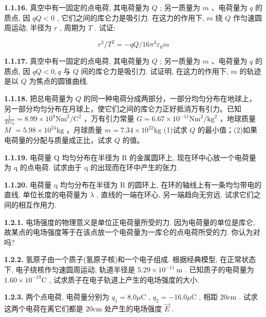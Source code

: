 \vfill

\newpage
\textbf{1.1.16.} 真空中有一固定的点电荷, 其电荷量为 $Q$ ; 另一质量为 $m$ 、电荷量为 $q$ 的质点, 因 $qQ < 0$ , 它们之间的库仑力是吸引力. 在这力的作用下, $m$ 绕 $Q$ 作匀速圆周运动, 半径为 $r$ , 周期为 $T$ . 试证:

$$
r ^ {3} / T ^ {2} = - q Q / 1 6 \pi^ {3} \varepsilon_ {0} m
$$

\vfill

\textbf{1.1.17.} 真空中有一固定的点电荷, 其电荷量为 $Q$ ; 另一质量为 $m$ 、电荷量为 $q$ 的质点, 因 $qQ < 0, q$ 与 $Q$ 间的库仑力是吸引力. 试证明, 在这力的作用下, $m$ 的轨迹是以 $Q$ 为焦点的圆锥曲线.

\vfill

\newpage
\textbf{1.1.18.} 把总电荷量为 $Q$ 的同一种电荷分成两部分，一部分均匀分布在地球上，另一部分均匀分布在月球上，使它们之间的库仑力正好抵消万有引力。已知 $\displaystyle \frac{1}{4\pi\varepsilon_0} = 8.99\times 10^{9}\mathrm{Nm}^{2} / \mathrm{C}^{2}$ ，万有引力常量 $G = 6.67\times 10^{-11}\mathrm{Nm}^2 /\mathrm{kg}^2$ ，地球质量 $M$ $= 5.98\times 10^{24}\mathrm{kg}$ ，月球质量 $m = 7.34\times 10^{22}\mathrm{kg}$ (1)试求 $Q$ 的最小值；(2)如果电荷量的分配与质量成正比，试求 $Q$ 的值。

\vfill

\textbf{1.1.19.} 电荷量 Q 均匀分布在半径为 R 的金属圆环上, 现在环中心放一个电荷量为 q 的点电荷. 试求由于 q 的出现而在环中产生的张力.

\vfill

\newpage
\textbf{1.1.20.} 电荷量 q 均匀分布在半径为 R 的圆环上, 在环的轴线上有一条均匀带电的直线, 单位长度的电荷量为 $\lambda$ , 直线的一端在环心, 另一端趋向无穷远. 试求它们之间的相互作用力.

\vfill

\textbf{1.2.1.} 电场强度的物理意义是单位正电荷量所受的力. 因为电荷量的单位是库仑, 故某点的电场强度等于在该点放一个电荷量为一库仑的点电荷所受的力. 你认为对吗?

\vfill

\newpage
\textbf{1.2.2.} 氢原子由一个质子(氢原子核)和一个电子组成. 根据经典模型, 在正常状态下, 电子绕核作匀速圆周运动, 轨道半径是 $5.29 \times 10^{-11} \mathrm{~m}$ . 已知质子的电荷量为 $1.60 \times 10^{-19} \mathrm{C}$ , 试求质子在电子轨道上产生的电场强度的大小.

\vfill

\textbf{1.2.3.} 两个点电荷, 电荷量分别为 $q_{1} = 8.0\mu \mathrm{C}$ , $q_{2} = -16.0\mu \mathrm{C}$ , 相距 $20\mathrm{cm}$ . 试求这两个电荷在离它们都是 $20\mathrm{cm}$ 处产生的电场强度 $\vec{E}$ .

